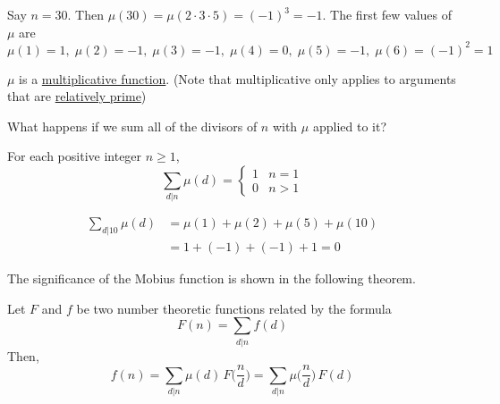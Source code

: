 \documentclass{article}
\newcounter{theorem}[section]
\newcounter{example}[section]
\begin{document}
\begin{example}
  \label{ex:first-values-of-the-mobius-function}
Say $n = 30$. Then $\mu(30) = \mu(2 \cdot 3 \cdot 5) = (-1)^3 = -1$. The first few values of $\mu$ are
\begin{equation}
  \mu(1) = 1, \; \mu(2) = -1, \; \mu(3) = -1, \; \mu(4) = 0, \; \mu(5) = -1, \; \mu(6) = (-1)^2 = 1
\end{equation}
\end{example}

\begin{lemma}[$\mu$ Is Multiplicative]
  \label{thm:mu-is-multiplicative}
$\mu$ is a \hyperref[def:multiplicative-function]{multiplicative function}. (Note that multiplicative only applies to arguments that are \hyperref[def:relatively-prime]{relatively prime})
\end{lemma}

What happens if we sum all of the divisors of $n$ with $\mu$ applied to it? 

\begin{theorem}
  \label{thm:divisor-sum-of-the-mobius-function}
For each positive integer $n \geq 1$, 
\begin{equation}
  \sum_{d|n} \mu(d) = \begin{cases}
  1 & n = 1\\
  0 & n > 1
  \end{cases}
\end{equation}
\end{theorem}

\begin{example}[Möbius Divisor Sum for $n = 10$]
  \label{ex:mobius-divisor-sum-for-n10}
\begin{align*}
    \sum_{d|10} \mu(d) & = \mu(1) + \mu(2) + \mu(5) + \mu(10) \\
    & = 1 + (-1) + (-1) + 1 = 0
\end{align*}
\end{example}

The significance of the Mobius function is shown in the following theorem. 

\begin{theorem}
  \label{thm:mobius-inversion-formula}
Let $F$ and $f$ be two number theoretic functions related by the formula
\begin{equation}
  F(n) = \sum_{d|n} f(d)
\end{equation}
Then,
\begin{equation}
  f(n) = \sum_{d|n} \mu(d)\, F \Big(\frac{n}{d} \Big) = \sum_{d|n} \mu \Big( \frac{n}{d} \Big) \, F(d)
\end{equation}
\end{theorem}
\end{document}
